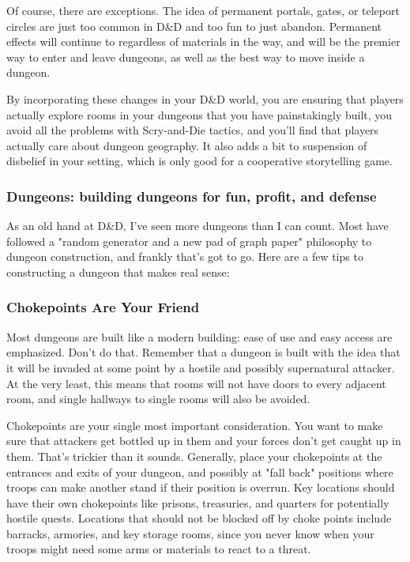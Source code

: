Of course, there are exceptions. The idea of permanent portals, gates, or teleport circles are just too common in D\&D and too fun to just abandon. Permanent effects will continue to regardless of materials in the way, and will be the premier way to enter and leave dungeons, as well as the best way to move inside a dungeon.

By incorporating these changes in your D\&D world, you are ensuring that players actually explore rooms in your dungeons that you have painstakingly built, you avoid all the problems with Scry-and-Die tactics, and you'll find that players actually care about dungeon geography. It also adds a bit to suspension of disbelief in your setting, which is only good for a cooperative storytelling game.

\subsubsection{Dungeons: building dungeons for fun, profit, and defense}
As an old hand at D\&D, I've seen more dungeons than I can count. Most have followed a "random generator and a new pad of graph paper" philosophy to dungeon construction, and frankly that's got to go. Here are a few tips to constructing a dungeon that makes real sense:

\subsubsection{Chokepoints Are Your Friend}
Most dungeons are built like a modern building: ease of use and easy access are emphasized. Don't do that. Remember that a dungeon is built with the idea that it will be invaded at some point by a hostile and possibly supernatural attacker. At the very least, this means that rooms will not have doors to every adjacent room, and single hallways to single rooms will also be avoided.

Chokepoints are your single most important consideration. You want to make sure that attackers get bottled up in them and your forces don't get caught up in them. That's trickier than it sounds. Generally, place your chokepoints at the entrances and exits of your dungeon, and possibly at "fall back" positions where troops can make another stand if their position is overrun. Key locations should have their own chokepoints like prisons, treasuries, and quarters for potentially hostile quests. Locations that should not be blocked off by choke points include barracks, armories, and key storage rooms, since you never know when your troops might need some arms or materials to react to a threat.

